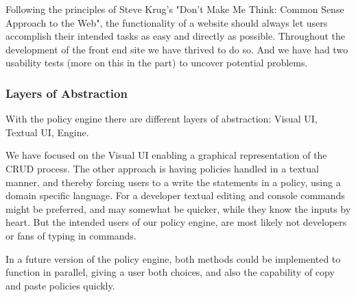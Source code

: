 Following the principles of Steve Krug's "Don't Make Me Think: Common Sense Approach to the Web"\cite{Krug:2005:DMM:1051204}, the functionality of a website should always let users accomplish their intended tasks as easy and directly as possible.
Throughout the development of the front end site we have thrived to do so. And we have had two usability tests (more on this in the  part) to uncover potential problems.

\subsubsection{Layers of Abstraction}

With the policy engine there are different layers of abstraction: Visual UI, Textual UI, Engine.

We have focused on the Visual UI enabling a graphical representation of the CRUD process. The other approach is having policies handled in a textual manner, and thereby forcing users to a write the statements in a policy, using a domain specific language. For a developer textual editing and console commands might be preferred, and may somewhat be quicker, while they know the inputs by heart. But the intended users of our policy engine, are most likely not developers or fans of typing in commands.

In a future version of the policy engine, both methods could be implemented to function in parallel, giving a user both choices, and also the capability of copy and paste policies quickly.